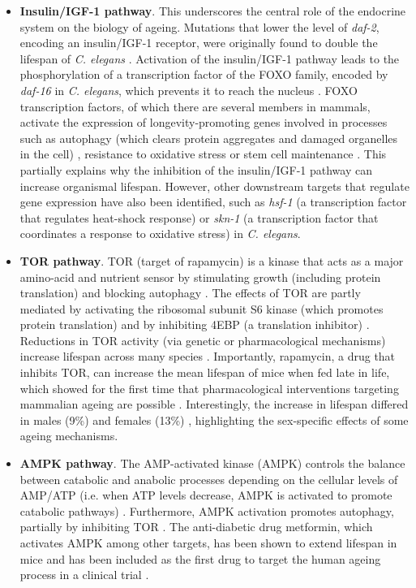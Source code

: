 \begin{itemize} 

	\item \textbf{Insulin/\acrshort{IGF-1} pathway}. This underscores the central role of the endocrine system on the biology of ageing. Mutations that lower the level of \textit{daf-2}, encoding an insulin/IGF-1 receptor, were originally found to double the lifespan of \textit{C. elegans} \citep{Kenyon1993,Guarente2000}. Activation of the insulin/IGF-1 pathway leads to the phosphorylation of a transcription factor of the FOXO family, encoded by \textit{daf-16} in \textit{C. elegans}, which prevents it to reach the nucleus \citep{Lin2001}. FOXO transcription factors, of which there are several members in mammals, activate the expression of longevity-promoting genes involved in processes such as autophagy (which clears protein aggregates and damaged organelles in the cell) \citep{Singh2019}, resistance to oxidative stress or stem cell maintenance \citep{Martins2016}. This partially explains why the inhibition of the insulin/IGF-1 pathway can increase organismal lifespan. However, other downstream targets that regulate gene expression have also been identified, such as \textit{hsf-1} (a transcription factor that regulates heat-shock response) \citep{Hsu2003} or \textit{skn-1} (a transcription factor that coordinates a response to oxidative stress) \citep{Tullet2008} in \textit{C. elegans}.
	
	\item \textbf{\acrshort{TOR} pathway}. \acrshort{TOR} (target of rapamycin) is a kinase that acts as a major amino-acid and nutrient sensor by stimulating growth (including protein translation) and blocking autophagy \citep{Kenyon2010}. The effects of TOR are partly mediated by activating the ribosomal subunit S6 kinase (which promotes protein translation) and by inhibiting 4EBP (a translation inhibitor)  \citep{Kenyon2010,Um2006}. Reductions in TOR activity (via genetic or pharmacological mechanisms) increase lifespan across many species \citep{Kenyon2010}. Importantly, rapamycin, a drug that inhibits TOR, can increase the mean lifespan of mice when fed late in life, which showed for the first time that pharmacological interventions targeting mammalian ageing are possible \citep{Harrison2009}. Interestingly, the increase in lifespan differed in males (9\%) and females (13\%) \citep{Harrison2009}, highlighting the sex-specific effects of some ageing mechanisms. 
	
	\item \textbf{AMPK pathway}. The AMP-activated kinase (\acrshort{AMPK}) controls the balance between catabolic and anabolic processes depending on the cellular levels of \acrshort{AMP}/\acrshort{ATP} (i.e. when ATP levels decrease, AMPK is activated to promote catabolic pathways) \citep{Kenyon2010,Mihaylova2011}. Furthermore, AMPK activation promotes autophagy, partially by inhibiting TOR \citep{Mihaylova2011}. The anti-diabetic drug metformin, which activates AMPK among other targets, has been shown to extend lifespan in mice \citep{Anisimov2008,Martin-Montalvo2013} and has been included as the first drug to target the human ageing process in a clinical trial \citep{Barzilai2016}.
		

\end{itemize}

